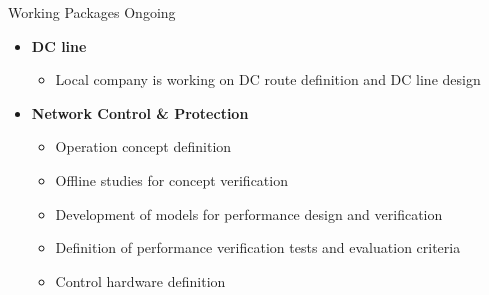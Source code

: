 \begin{frame}{Working Packages Ongoing}
  \begin{itemize}
  \setlength{\itemsep}{0.5em}
  \item \textbf{DC line}
    \begin{itemize}
      \item Local company is working on DC route definition and DC line design

    \end{itemize}
  
    \item \textbf{Network Control \& Protection}
    \begin{itemize}
      \item Operation concept definition
      \item Offline studies for concept verification
      \item Development of models for performance design and verification
      \item Definition of performance verification tests and evaluation criteria
      \item Control hardware definition
    \end{itemize}
  
\end{itemize}
\end{frame}




